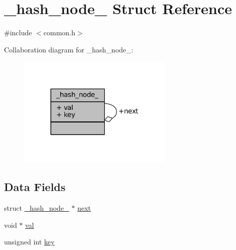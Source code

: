 \hypertarget{struct__hash__node__}{\section{\-\_\-hash\-\_\-node\-\_\- Struct Reference}
\label{struct__hash__node__}
}


{\ttfamily \#include $<$common.\-h$>$}



Collaboration diagram for \-\_\-hash\-\_\-node\-\_\-\-:
\nopagebreak
\begin{figure}[H]
\begin{center}
\leavevmode
\includegraphics[width=211pt]{struct__hash__node____coll__graph}
\end{center}
\end{figure}
\subsection*{Data Fields}
\begin{DoxyCompactItemize}
\item 
struct \hyperlink{struct__hash__node__}{\-\_\-hash\-\_\-node\-\_\-} $\ast$ \hyperlink{struct__hash__node___a5805097a777732cd94d182bab6c7feb2}{next}
\item 
void $\ast$ \hyperlink{struct__hash__node___ab03f36f103bdec81305fd301f1f93885}{val}
\item 
unsigned int \hyperlink{struct__hash__node___a668a437ea5e7a51173aee9f82f6747de}{key}
\end{DoxyCompactItemize}



